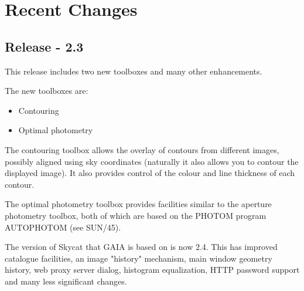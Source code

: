 \documentclass[twoside,11pt]{article}
\newcommand{\xref}[3]{#1}
\newcommand{\xlabel}[1]{}
\renewcommand{\_}{\texttt{\symbol{95}}}
\begin{document}
\section{Recent \xlabel{changes}Changes}

\subsection{Release - 2.3}
  This release includes two new toolboxes and many other enhancements.

  The new toolboxes are:
  \begin{itemize}
     \item Contouring
     \item Optimal photometry
  \end{itemize}

  The contouring toolbox allows the overlay of contours from different
  images, possibly aligned using sky coordinates (naturally it also
  allows you to contour the displayed image). It also provides control
  of the colour and line thickness of each contour.

  The optimal photometry toolbox provides facilities similar to the
  aperture photometry toolbox, both of which are based on the PHOTOM
  program AUTOPHOTOM (see \xref{SUN/45}{sun45}{}).

  The version of Skycat that GAIA is based on is now 2.4. This has
  improved catalogue facilities, an image "history" mechanism, main
  window geometry history, web proxy server dialog, histogram
  equalization, HTTP password support and many less significant changes.
\end{document}
